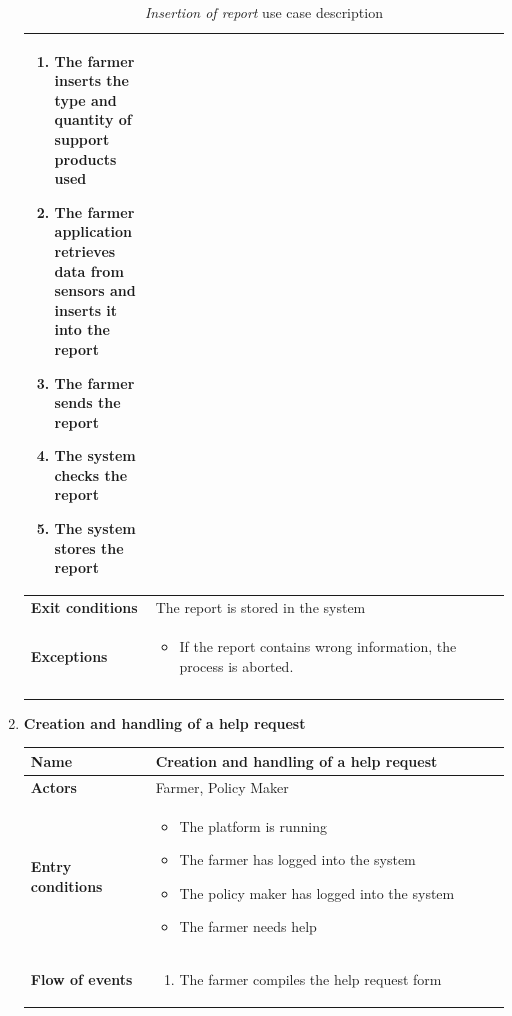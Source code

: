 \documentclass[10pt]{article}
\begin{document}
\begin{enumerate}[label=\textbf{UC\arabic*}]
\begin{longtable}{p{0.26\linewidth}p{0.75\linewidth}}
\begin{enumerate}
                \item The farmer inserts the type and quantity of support products used
                \item The farmer application retrieves data from sensors and inserts it into the report
                \item The farmer sends the report
                \item The system checks the report
                \item The system stores the report
            \end{enumerate} \\
            \midrule
            \textbf{Exit conditions} & The report is stored in the system\\
            \midrule
            \textbf{Exceptions} & 
            \begin{itemize}
                \item If the report contains wrong information, the process is aborted.
            \end{itemize} \\
            \bottomrule
            \caption{\emph{Insertion of report} use case description}
        \end{longtable}
    \newpage
    \item \label{uc:uc5} \textbf{Creation and handling of a help request}
        \begin{longtable}{p{0.26\linewidth}p{0.75\linewidth}}
            \toprule
            \textbf{Name} & \textbf{Creation and handling of a help request} \\
            \midrule
            \textbf{Actors} & Farmer, Policy Maker\\
            \midrule
            \textbf{Entry conditions} & 
            \begin{itemize}
                \item The platform is running
                \item The farmer has logged into the system
                \item The policy maker has logged into the system
                \item The farmer needs help
            \end{itemize}\\
            \midrule
            \textbf{Flow of events} & 
            \begin{enumerate}
                \item The farmer compiles the help request form

\end{enumerate}
\end{longtable}
\end{enumerate}
\end{document}
